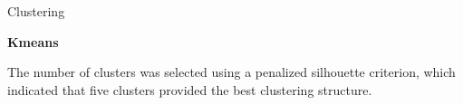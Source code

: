 \begin{frame}[allowframebreaks]{Clustering}
    
    \textbf{Kmeans}
    
    The number of clusters was selected using a penalized silhouette criterion, which indicated that five clusters provided the best clustering structure.

\end{frame}